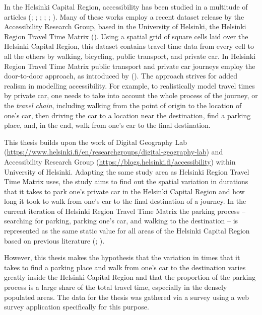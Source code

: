 In the Helsinki Capital Region, accessibility has been studied in a multitude of articles (\cite{Jarvi2014}; \cite{Toivonen2014a}; \cite{Laatikainen2015}; \cite{Salonen2016}; \cite{Tenkanen2017}; \cite{Tenkanen2018}). Many of these works employ a recent dataset release by the Accessibility Research Group, based in the University of Helsinki, the Helsinki Region Travel Time Matrix (\cite{Tenkanen2018}). Using a spatial grid of square cells laid over the Helsinki Capital Region, this dataset contains travel time data from every cell to all the others by walking, bicycling, public transport, and private car. In Helsinki Region Travel Time Matrix public transport and private car journeys employ the door-to-door approach, as introduced by \citeauthor{Salonen2013} (\citeyear{Salonen2013}). The approach strives for added realism in modelling accessibility. For example, to realistically model travel times by private car, one needs to take into account the whole process of the journey, or the \textit{travel chain}, including walking from the point of origin to the location of one's car, then driving the car to a location near the destination, find a parking place, and, in the end, walk from one's car to the final destination.

This thesis builds upon the work of Digital Geography Lab (\textcolor{blue}{\url{https://www.helsinki.fi/en/researchgroups/digital-geography-lab}}) and Accessibility Research Group (\textcolor{blue}{\url{https://blogs.helsinki.fi/accessibility}}) within University of Helsinki. Adapting the same study area as Helsinki Region Travel Time Matrix uses, the study aims to find out the spatial variation in durations that it takes to park one's private car in the Helsinki Capital Region and how long it took to walk from one's car to the final destination of a journey. In the current iteration of Helsinki Region Travel Time Matrix the parking process -- searching for parking, parking one's car, and walking to the destination -- is represented as the same static value for all areas of the Helsinki Capital Region based on previous literature (\cite{Tenkanen2020}; \cite{Kalenoja2003}).

However, this thesis makes the hypothesis that the variation in times that it takes to find a parking place and walk from one's car to the destination varies greatly inside the Helsinki Capital Region and that the proportion of the parking process is a large share of the total travel time, especially in the densely populated areas. The data for the thesis was gathered via a survey using a web survey application specifically for this purpose.

